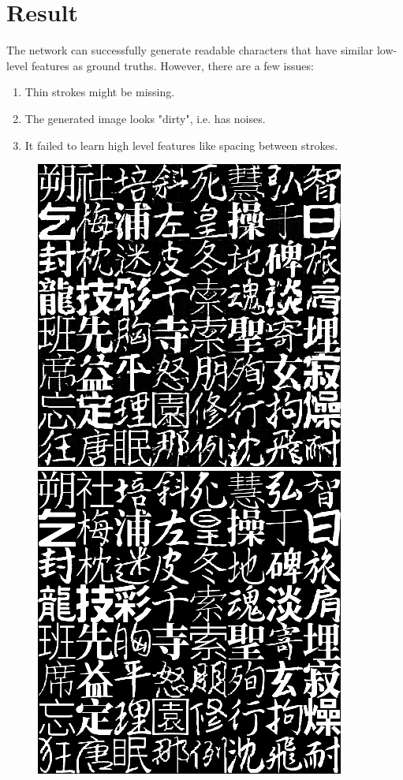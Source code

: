 \documentclass[10pt,twocolumn,letterpaper]{article}
\begin{document}
\section{Result}
The network can successfully generate readable characters that have similar low-level features as ground truths. However, there are a few issues:

\begin{enumerate}
	\item Thin strokes might be missing.
	\item The generated image looks "dirty", i.e. has noises.
	\item It failed to learn high level features like spacing between strokes.
\end{enumerate}


\begin{figure}[t]
	\begin{center}
		\includegraphics[width=0.8\linewidth]{385gen.png}
		\includegraphics[width=0.8\linewidth]{385gt.png}

\end{center}
\end{figure}
\end{document}
